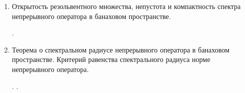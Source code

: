 \begin{enumerate}
    \item Открытость резольвентного множества, непустота и компактность спектра непрерывного оператора в банаховом пространстве.
    
    . 


    \item Теорема о спектральном радиусе непрерывного оператора в банаховом пространстве. Критерий равенства спектрального радиуса норме непрерывного оператора.
    
    . .

\end{enumerate}